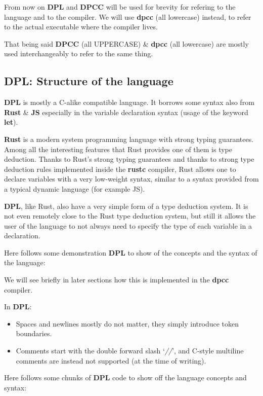 \documentclass[a4paper]{article}
\begin{document}
From now on \textbf{DPL} and \textbf{DPCC} will be used for brevity for refering to the language and to the compiler.
We will use \textbf{dpcc} (all lowercase) instead, to refer to the actual executable where the compiler lives.

That being said \textbf{DPCC} (all UPPERCASE) \& \textbf{dpcc} (all lowercase) are mostly used interchangeably to refer to the same thing.


\subsection{DPL: Structure of the language}

\textbf{DPL} is mostly a C-alike compatible language. It borrows some syntax also from \textbf{Rust} \&
\textbf{JS} especially in the variable declaration syntax (usage of the keyword \textbf{let}).

\textbf{Rust} is a modern system programming language with strong typing guarantees.
Among all the interesting features that Rust provides one of them is type deduction.
Thanks to Rust's strong typing guarantees and thanks to strong type deduction rules implemented
inside the \textbf{rustc} compiler, Rust
allows one to declare variables with a very low-weight syntax, similar
to a syntax provided from a typical dynamic language (for example JS).

\textbf{DPL}, like Rust, also have a very simple form of a type deduction system.
It is not even remotely close to the Rust type deduction system, but still it
allows the user of the language to not always need to specify the type of each variable in a declaration.

Here follows some demonstration \textbf{DPL} to show of the concepts and the syntax of the language:

We will see briefly in later sections how this is implemented in the \textbf{dpcc} compiler.


In \textbf{DPL}:

\begin{itemize}
\item Spaces and newlines mostly do not matter, they simply introduce token boundaries.
\item Comments start with the double forward slash `\emph{//}', and C-style multiline comments are
instead not supported (at the time of writing).
\end{itemize}




Here follows some chunks of \textbf{DPL} code to show off the language concepts and syntax:
\end{document}
